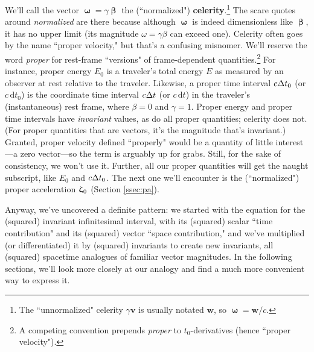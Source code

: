\documentclass[12pt]{article}
\renewcommand{\vv}[1]{\mathbf{#1}}
\newcommand{\dd}[1]{\mathrm{d}#1}
\newcommand{\vvbeta}{\bm{\upbeta}}
\newcommand{\vvomega}{\bm{\upomega}}
\newcommand{\vvzeta}{\bm{\upzeta}}
\begin{document}
We'll call the vector $\vvomega = \gamma \vvbeta$ the (``normalized") \textbf{celerity}.\footnote{The ``unnormalized" celerity $\gamma \vv v$ is usually notated $\vv w$, so $\vvomega = \vv w / c$.} The scare quotes around \emph{normalized} are there because although $\vvomega$ is indeed dimensionless like $\vvbeta$, it has no upper limit (its magnitude $\omega = \gamma \beta$ can exceed one). Celerity often goes by the name ``proper velocity," but that's a confusing misnomer. We'll reserve the word \emph{proper} for rest-frame ``versions" of frame-dependent quantities.\footnote{\label{fn:pr}A competing convention prepends \emph{proper} to $t_0$-derivatives (hence ``proper velocity").} For instance, proper energy $E_0$ is a traveler's total energy $E$ as measured by an observer at rest relative to the traveler. Likewise, a proper time interval $c \mkern.5mu \Delta t_0$ (or $c \, \dd t_0$) is the coordinate time interval $c \mkern.5mu \Delta t$ (or $c \, \dd t$) in the traveler's (instantaneous) rest frame, where $\beta = 0$ and $\gamma = 1$. Proper energy and proper time intervals have \emph{invariant} values, as do all proper quantities; celerity does not. (For proper quantities that are vectors, it's the magnitude that's invariant.) Granted, proper velocity defined ``properly" would be a quantity of little interest---a zero vector---so the term is arguably up for grabs. Still, for the sake of consistency, we won't use it. Further, all our proper quantities will get the naught subscript, like $E_0$ and $c \mkern.5mu \Delta t_0$. The next one we'll encounter is the (``normalized") proper acceleration $\vvzeta_{\mkern1mu 0}$ (Section \ref{ssec:pa}).

Anyway, we've uncovered a definite pattern: we started with the equation for the (squared) invariant infinitesimal interval, with its (squared) scalar ``time contribution" and its (squared) vector ``space contribution," and we've multiplied (or differentiated) it by (squared) invariants to create new invariants, all (squared) spacetime analogues of familiar vector magnitudes. In the following sections, we'll look more closely at our analogy and find a much more convenient way to express it.
\end{document}
